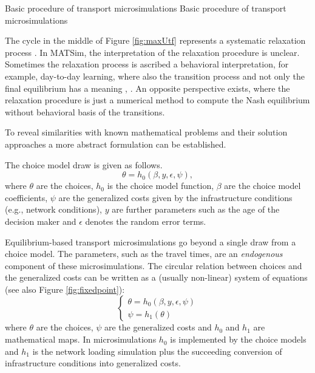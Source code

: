 \createfigure%
{Basic procedure of transport microsimulations}%
{\color{gray} Basic procedure of transport microsimulations}%
{\label{fig:maxUtf}}%
{~}%
{}



The cycle in the middle of Figure \ref{fig:maxUtf} represents a systematic relaxation process \citep[e.g.,][Figure 1.3]{Balmer_PhDThesis_2007}. In MATSim, the interpretation of the relaxation procedure is unclear. Sometimes the relaxation process is ascribed a behavioral interpretation, for example, day-to-day learning, where also the transition process and not only the final equilibrium has a meaning \citep[][p.128]{LiuEtAl_TransResA_2006}, \citep[][p.523]{NagelBarrett_IJMPC_1997}. An opposite perspective exists, where the relaxation procedure is just a numerical method to compute the Nash equilibrium without behavioral basis of the transitions.

To reveal similarities with known mathematical problems and their solution approaches a more abstract formulation can be established. 

The choice model draw is given as follows.
\begin{equation}
\label{eq:choiceModel}
\theta = h_0(\beta, y, \epsilon, \psi),
\end{equation}
where $\theta$ are the choices, $h_0$ is the choice model function, $\beta$ are the choice model coefficients, $\psi$ are the generalized costs given by the infrastructure conditions (e.g., network conditions), $y$ are further parameters such as the age of the decision maker and $\epsilon$ denotes the random error terms. 

Equilibrium-based transport microsimulations go beyond a single draw from a choice model. The parameters, such as the travel times, are an \emph{endogenous} component of these microsimulations. The circular relation between choices and the generalized costs can be written as a (usually non-linear) system of equations (see also Figure \ref{fig:fixedpoint}): 
\begin{equation}
\label{eq:initialSystem}
\begin{cases}
\theta = h_0(\beta, y, \epsilon, \psi) \\
\psi = h_1(\theta) 
\end{cases}
\end{equation}
where $\theta$ are the choices, $\psi$ are the generalized costs and $h_0$ and $h_1$ are mathematical maps. In microsimulations $h_0$ is implemented by the choice models and $h_1$ is the network loading simulation plus the succeeding conversion of infrastructure conditions into generalized costs. 

